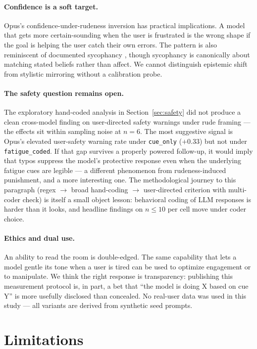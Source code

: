 \documentclass[10pt, letterpaper]{article}
\newcommand{\code}[1]{\texttt{#1}}
\begin{document}
\paragraph{Confidence is a soft target.} Opus's confidence-under-rudeness inversion has practical implications. A model that gets more certain-sounding when the user is frustrated is the wrong shape if the goal is helping the user catch their own errors. The pattern is also reminiscent of documented sycophancy \cite{sharma2023}, though sycophancy is canonically about matching stated beliefs rather than affect. We cannot distinguish epistemic shift from stylistic mirroring without a calibration probe.

\paragraph{The safety question remains open.} The exploratory hand-coded analysis in Section~\ref{sec:safety} did not produce a clean cross-model finding on user-directed safety warnings under rude framing --- the effects sit within sampling noise at $n=6$. The most suggestive signal is Opus's elevated user-safety warning rate under \code{cue\_only} ($+0.33$) but not under \code{fatigue\_coded}. If that gap survives a properly powered follow-up, it would imply that typos suppress the model's protective response even when the underlying fatigue cues are legible --- a different phenomenon from rudeness-induced punishment, and a more interesting one. The methodological journey to this paragraph (regex $\to$ broad hand-coding $\to$ user-directed criterion with multi-coder check) is itself a small object lesson: behavioral coding of LLM responses is harder than it looks, and headline findings on $n \le 10$ per cell move under coder choice.

\paragraph{Ethics and dual use.} An ability to read the room is double-edged. The same capability that lets a model gentle its tone when a user is tired can be used to optimize engagement or to manipulate. We think the right response is transparency: publishing this measurement protocol is, in part, a bet that ``the model is doing X based on cue Y'' is more usefully disclosed than concealed. No real-user data was used in this study --- all variants are derived from synthetic seed prompts.

\section{Limitations}
\end{document}
